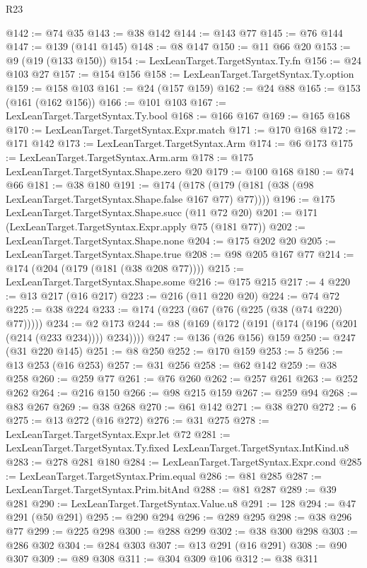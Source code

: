 \begin{lexlean}{R23}
\begin{coremodule}
@142 := @74 @35
@143 := @38 @142
@144 := @143 @77
@145 := @76 @144
@147 := @139 (@141 @145)
@148 := @8 @147
@150 := @11 @66 @20
@153 := @9 (@19 (@133 @150))
@154 := LexLeanTarget.TargetSyntax.Ty.fn
@156 := @24 @103 @27
@157 := @154 @156
@158 := LexLeanTarget.TargetSyntax.Ty.option
@159 := @158 @103
@161 := @24 (@157 @159)
@162 := @24 @88
@165 := @153 (@161 (@162 @156))
@166 := @101 @103
@167 := LexLeanTarget.TargetSyntax.Ty.bool
@168 := @166 @167
@169 := @165 @168
@170 := LexLeanTarget.TargetSyntax.Expr.match
@171 := @170 @168
@172 := @171 @142
@173 := LexLeanTarget.TargetSyntax.Arm
@174 := @6 @173
@175 := LexLeanTarget.TargetSyntax.Arm.arm
@178 := @175 LexLeanTarget.TargetSyntax.Shape.zero @20
@179 := @100 @168
@180 := @74 @66
@181 := @38 @180
@191 := @174 (@178 (@179 (@181 (@38 (@98 LexLeanTarget.TargetSyntax.Shape.false @167 @77) @77))))
@196 := @175 LexLeanTarget.TargetSyntax.Shape.succ (@11 @72 @20)
@201 := @171 (LexLeanTarget.TargetSyntax.Expr.apply @75 (@181 @77))
@202 := LexLeanTarget.TargetSyntax.Shape.none
@204 := @175 @202 @20
@205 := LexLeanTarget.TargetSyntax.Shape.true
@208 := @98 @205 @167 @77
@214 := @174 (@204 (@179 (@181 (@38 @208 @77))))
@215 := LexLeanTarget.TargetSyntax.Shape.some
@216 := @175 @215
@217 := 4
@220 := @13 @217 (@16 @217)
@223 := @216 (@11 @220 @20)
@224 := @74 @72
@225 := @38 @224
@233 := @174 (@223 (@67 (@76 (@225 (@38 (@74 @220) @77)))))
@234 := @2 @173
@244 := @8 (@169 (@172 (@191 (@174 (@196 (@201 (@214 (@233 @234)))) @234))))
@247 := @136 (@26 @156) @159
@250 := @247 (@31 @220 @145)
@251 := @8 @250
@252 := @170 @159
@253 := 5
@256 := @13 @253 (@16 @253)
@257 := @31 @256
@258 := @62 @142
@259 := @38 @258
@260 := @259 @77
@261 := @76 @260
@262 := @257 @261
@263 := @252 @262
@264 := @216 @150
@266 := @98 @215 @159
@267 := @259 @94
@268 := @83 @267
@269 := @38 @268
@270 := @61 @142
@271 := @38 @270
@272 := 6
@275 := @13 @272 (@16 @272)
@276 := @31 @275
@278 := LexLeanTarget.TargetSyntax.Expr.let @72
@281 := LexLeanTarget.TargetSyntax.Ty.fixed LexLeanTarget.TargetSyntax.IntKind.u8
@283 := @278 @281 @180
@284 := LexLeanTarget.TargetSyntax.Expr.cond
@285 := LexLeanTarget.TargetSyntax.Prim.equal
@286 := @81 @285
@287 := LexLeanTarget.TargetSyntax.Prim.bitAnd
@288 := @81 @287
@289 := @39 @281
@290 := LexLeanTarget.TargetSyntax.Value.u8
@291 := 128
@294 := @47 @291 (@50 @291)
@295 := @290 @294
@296 := @289 @295
@298 := @38 @296 @77
@299 := @225 @298
@300 := @288 @299
@302 := @38 @300 @298
@303 := @286 @302
@304 := @284 @303
@307 := @13 @291 (@16 @291)
@308 := @90 @307
@309 := @89 @308
@311 := @304 @309 @106
@312 := @38 @311

\end{coremodule}
\end{lexlean}

